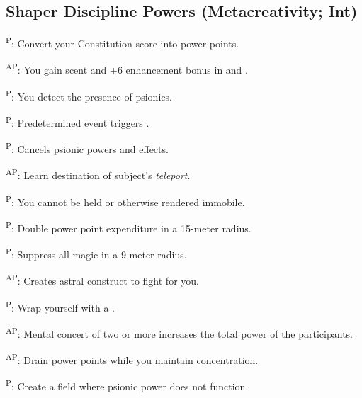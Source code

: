 \subsection{Shaper Discipline Powers {\normalsize(Metacreativity; Int)}}
\begin{enumerate*}
\item {}\textsuperscript{P}: Convert your Constitution score into power points.

      \textsuperscript{AP}: You gain scent and +6 enhancement bonus in  and .

\item {}\textsuperscript{P}: You detect the presence of psionics.

      \textsuperscript{P}: Predetermined event triggers .

\item {}\textsuperscript{P}: Cancels psionic powers and effects.

      \textsuperscript{AP}: Learn destination of subject's \emph{teleport}.

\item {}\textsuperscript{P}: You cannot be held or otherwise rendered immobile.

      \textsuperscript{P}: Double power point expenditure in a 15-meter radius.

\item {}\textsuperscript{P}: Suppress all magic in a 9-meter radius.

      \textsuperscript{AP}: Creates astral construct to fight for you. %

      \textsuperscript{P}: Wrap yourself with a .

      \textsuperscript{AP}: Mental concert of two or more increases the total power of the participants.

      \textsuperscript{AP}: Drain power points while you maintain concentration.

\item {}\textsuperscript{P}: Create a field where psionic power does not function. %


\end{enumerate*}
